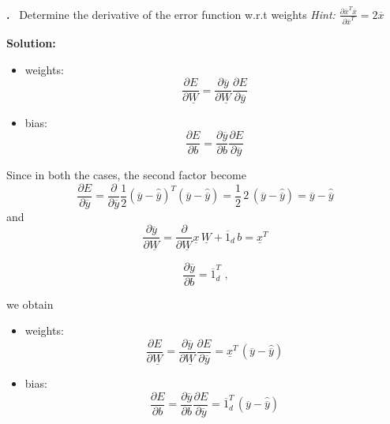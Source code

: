 \documentclass[a4paper,12pt]{article} %
\newcounter{problem}
\newcounter{solution}
\newcommand\Problem{%
	\stepcounter{problem}%
	\textbf{\theproblem.}~%
	\setcounter{solution}{0}%
}
\newcommand\Solution{%
	\textbf{Solution:}\\%
}
\begin{document}
	\Problem{Determine the derivative of the error function w.r.t weights 
	\textit{Hint: $\frac{\partial 
	\overline{x}^T\overline{x}}{\partial\overline{x}^T} = 
	2\overline{x}$}}\medskip
	
	\Solution{	
		\begin{itemize}
			\item weights:
			\begin{equation}
			\frac{\partial E}{\partial \underline{W}}= \frac{\partial 
				\overline{y}}{\partial \underline{W}}\frac{\partial E}{\partial 
				\overline{y}}
			\end{equation}
			\item bias:
			\begin{equation}
			\frac{\partial E}{\partial {b}}= \frac{\partial 
				\overline{y}}{\partial {b}}\frac{\partial E}{\partial 
				\overline{y}}
			\end{equation}
		\end{itemize}
		
		Since in both the cases, the second factor become 
		\begin{equation*}
		\frac{\partial E}{\partial \overline{y}} = \frac{\partial }{\partial 
			\overline{y}} 
		\frac{1}{2}(\overline{y}-\hat{\overline{y}})^T(\overline{y}-\hat{\overline{y}})
		= 
		\frac{1}{2}\, 2 \, (\overline{y}-\hat{\overline{y}}) = 
		\overline{y}-\hat{\overline{y}}
		\end{equation*}
		and
		\begin{equation*}
			\frac{\partial \overline{y}}{\partial\underline{W}}= 
			\frac{\partial}{\partial\underline{W}}\underline{x} \, 
			\underline{W} + \overline{1}_d \, b = \underline{x}^T
		\end{equation*}
		 
		\begin{equation*}
			\frac{\partial \overline{y}}{\partial{b}}=\overline{1}_d^T \mbox{ ,}
		\end{equation*}
	
		we obtain
		
		\begin{itemize}
			\item weights:
			\begin{equation}
			\frac{\partial E}{\partial \underline{W}}= \frac{\partial 
				\overline{y}}{\partial \underline{W}}\frac{\partial E}{\partial 
				\overline{y}} = \underline{x}^T \, (\overline{y} - 
				\hat{\overline{y}})
			\end{equation}
			\item bias:
			\begin{equation}
			\frac{\partial E}{\partial {b}}= \frac{\partial 
				\overline{y}}{\partial {b}}\frac{\partial E}{\partial 
				\overline{y}} = \overline{1}_d^T \, (\overline{y} - 
			\hat{\overline{y}})
			\end{equation}
		\end{itemize}
	}\vspace{0.4cm}
	
\end{document}
